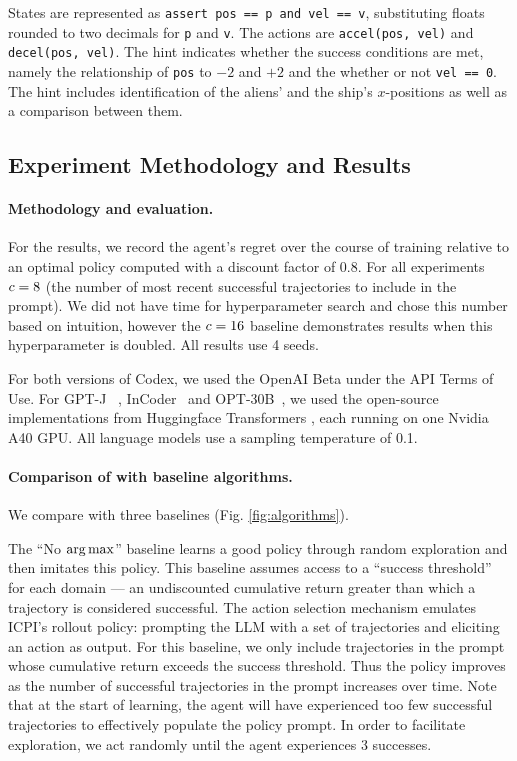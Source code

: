 \documentclass{article}
\newcommand\NoArgMax{``No $\argmax$''}
\begin{document}
States are represented as \texttt{assert pos == p and vel == v}, substituting
floats rounded to two decimals for \texttt{p} and \texttt{v}. The actions
are \texttt{accel(pos, vel)} and \texttt{decel(pos, vel)}. The hint
indicates whether the success conditions are met, namely the relationship
of \texttt{pos} to $-2$ and $+2$ and the whether or not \texttt{vel == 0}.
The hint includes identification of the aliens' and the ship's $x$-positions
as well as a comparison between them.

\subsection{Experiment Methodology and Results}

\paragraph{Methodology and evaluation.}
\label{para:methodology}
For the results, we record the agent's regret over the course of training
relative to an optimal policy computed with a discount factor of 0.8. For all
experiments $c = 8$ (the number of most recent successful
trajectories to include in the prompt). We did not have time for hyperparameter
search and chose this number based on intuition, however the $c =
  16$ baseline demonstrates results when this hyperparameter is doubled. All
results use 4 seeds.

For both versions of Codex, we used the OpenAI Beta under the API Terms of Use.
For GPT-J~\parencite{wang_gpt-j-6b_2021} , InCoder~\parencite{fried_incoder_2022} and
OPT-30B~\parencite{zhang_opt_2022}, we used the open-source implementations from
Huggingface Transformers \parencite{wolf_transformers_2020}, each running on one
Nvidia A40 GPU. All language models use a sampling temperature of 0.1.

\paragraph{Comparison of \Algorithm{} with baseline
  algorithms.}\label{para:baselines} We compare \Algorithm{} with three
baselines (Fig. \ref{fig:algorithms}).

The \NoArgMax{} baseline learns a good policy through random exploration and
then imitates this policy. This baseline assumes access to a ``success threshold''
for each domain --- an undiscounted cumulative return greater than which a
trajectory is considered successful. The action selection mechanism emulates
ICPI's rollout policy: prompting the LLM with a set of trajectories and
eliciting an action as output. For this baseline, we only include trajectories
in the prompt whose cumulative return exceeds the success threshold. Thus the
policy improves as the number of successful trajectories in the prompt increases
over time. Note that at the start of learning, the agent will have experienced
too few successful trajectories to effectively populate the policy prompt. In
order to facilitate exploration, we act randomly until the agent experiences 3
successes.
\end{document}
